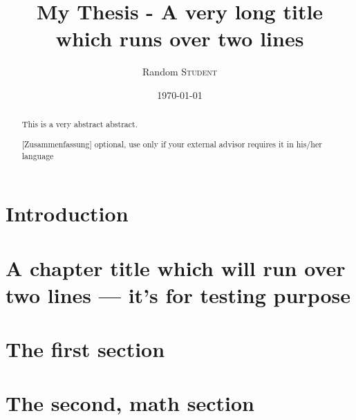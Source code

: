 \documentclass[11pt,mscthesis,report]{eapsthesis}
\title{My Thesis - A very long title\\ which runs over two
lines} %
\date{\today}
\author{Random \textsc{Student}}
\begin{document}
\maketitle %

\onehalfspace %
\frontmatter %

\begin{abstract}
This is a very abstract abstract. 

\lipsum
\end{abstract}

\begin{abstract}[Zusammenfassung]
optional, use only if your external advisor requires it in his/her
language 
\\

\lipsum
\end{abstract}

\begin{acknowledgements}
\lipsum 
\end{acknowledgements}

\tableofcontents 


\mainmatter

\section{Introduction}

\lipsum



\section[Short title]{A chapter title which will run over two lines --- it's for
  testing purpose}

\lipsum[1-2]

\section{The first section}
\lipsum[3-4]

 \section{The second, math section}
\end{document}
